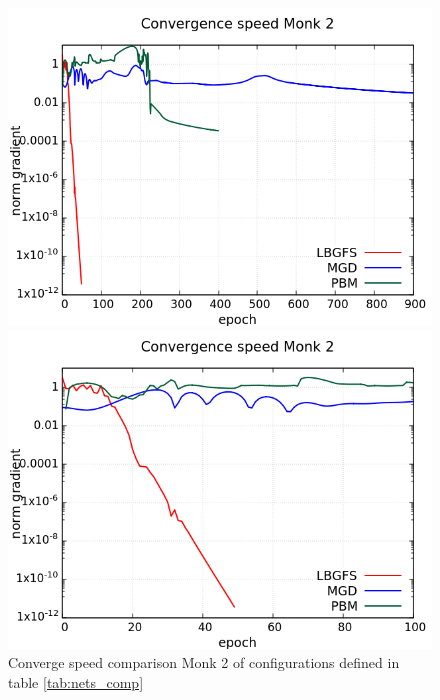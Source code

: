 \begin{figure}[H]
	\centering
	\begin{minipage}[t]{0.5\linewidth}
		\includegraphics[width=\linewidth]{data/Comparison/Monk2/Monk2_CS_Comparison_log_standard.png}
	\end{minipage}%
	\begin{minipage}[t]{0.5\linewidth}
		\includegraphics[width=\linewidth]{data/Comparison/Monk2/Monk2_CS_Comparison_log_zoom.png}
	\end{minipage}
	 \caption{Converge speed comparison Monk 2 of configurations defined in table \ref{tab:nets_comp}}
	 \label{CS-Monk2}
\end{figure}
